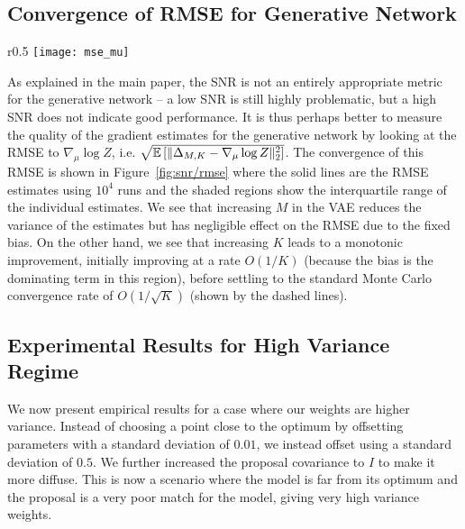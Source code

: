 \subsection{Convergence of RMSE for Generative Network}
\label{sec:app:rmse}

\begin{wrapfigure}{r}{0.5\textwidth}
	\centering
	\vspace{-15pt}
	\texttt{[image: mse\_mu]}
	\vspace{-10pt}
	\caption{RMSE in $\mu$ gradient estimate to $\nabla_{\mu} \log Z$ 
		\label{fig:snr/rmse}}
	\vspace{-8pt}
\end{wrapfigure} 
As explained in the main paper, the SNR is not an entirely appropriate metric for
the generative network -- a low SNR is still highly problematic, but a high SNR
does not indicate good performance.
It is thus perhaps better to measure
the quality of the gradient estimates for the generative network by looking at the \gls{RMSE}
to $\nabla_{\mu} \log Z$, i.e. $\sqrt{\mathbb{E} \left[\lVert\Delta_{M,K}-\nabla_{\mu} \log Z\rVert_2^2\right]}$.
The convergence of this \gls{RMSE}  is shown in
Figure~\ref{fig:snr/rmse} where the solid lines are the \gls{RMSE} estimates using $10^4$ runs 
and the shaded regions
show the interquartile range of the individual estimates. We see that increasing 
$M$ in the \gls{VAE} reduces the variance
of the estimates but has negligible effect on the \gls{RMSE} due to the fixed bias.  On the
other hand,
we see that increasing $K$ leads to a monotonic improvement, initially improving
at a rate $O(1/K)$ (because the bias is the dominating term in this region),
before settling to the standard Monte Carlo convergence rate of $O(1/\sqrt{K})$
(shown by the dashed lines).

\subsection{Experimental Results for High Variance Regime}
\label{sec:hv}

\vspace{-4pt}

We now present empirical results for a case where our weights are higher variance. Instead
of choosing a point close to the optimum by offsetting parameters with a standard deviation of $0.01$, 
we instead offset using a standard deviation of $0.5$.  We further increased the proposal covariance to $I$
to make it more diffuse.  This is now a scenario where the model is far from its optimum and the proposal
is a very poor match for the model, giving very high variance weights.


